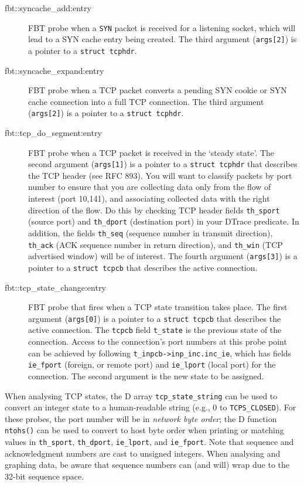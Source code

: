 \documentclass[a4paper,10pt]{article}
\begin{document}
\begin{description}
\item[fbt::syncache\_add:entry] FBT probe when a \texttt{SYN} packet is
  received for a listening socket, which will lead to a SYN cache entry being
  created.
  The third argument (\texttt{args[2]}) is a pointer to a \texttt{struct
  tcphdr}.

\item[fbt::syncache\_expand:entry] FBT probe when a TCP packet converts a
  pending SYN cookie or SYN cache connection into a full TCP connection.
  The third argument (\texttt{args[2]}) is a pointer to a \texttt{struct
  tcphdr}.

\item[fbt::tcp\_do\_segment:entry] FBT probe when a TCP packet is received in
  the `steady state'.
  The second argument (\texttt{args[1]}) is a pointer to a \texttt{struct
  tcphdr} that describes the TCP header (see RFC 893).
  You will want to classify packets by port number to ensure that you are
  collecting data only from the flow of interest (port 10,141), and
  associating collected data with the right direction of the flow.
  Do this by checking TCP header fields \texttt{th\_sport} (source port) and
  \texttt{th\_dport} (destination port) in your DTrace predicate.
  In addition, the fields \texttt{th\_seq} (sequence number in transmit
  direction), \texttt{th\_ack} (ACK sequence number in return direction), and
  \texttt{th\_win} (TCP advertised window) will be of interest.
  The fourth argument (\texttt{args[3]}) is a pointer to a \texttt{struct
  tcpcb} that describes the active connection.

\item[fbt::tcp\_state\_change:entry] FBT probe that fires when a TCP state
  transition takes place.
  The first argument (\texttt{args[0]}) is a pointer to a \texttt{struct
  tcpcb} that describes the active connection.
  The \texttt{tcpcb} field \texttt{t\_state} is the previous state of the
  connection.
  Access to the connection's port numbers at this probe point can be
  achieved by following \texttt{t\_inpcb->inp\_inc.inc\_ie}, which
  has fields \texttt{ie\_fport} (foreign, or remote port) and
  \texttt{ie\_lport} (local port) for the connection.
  The second argument is the new state to be assigned.
\end{description}

When analysing TCP states, the D array \texttt{tcp\_state\_string} can be used
to convert an integer state to a human-readable string (e.g., 0 to
\texttt{TCPS\_CLOSED}).
For these probes, the port number will be in \textit{network byte order}; the
D function \texttt{ntohs()} can be used to convert to host byte order when
printing or matching values in \texttt{th\_sport}, \texttt{th\_dport},
\texttt{ie\_lport}, and \texttt{ie\_fport}.
Note that sequence and acknowledgment numbers are cast to unsigned integers.
When analysing and graphing data, be aware that sequence numbers can (and
will) wrap due to the 32-bit sequence space.
\end{document}
